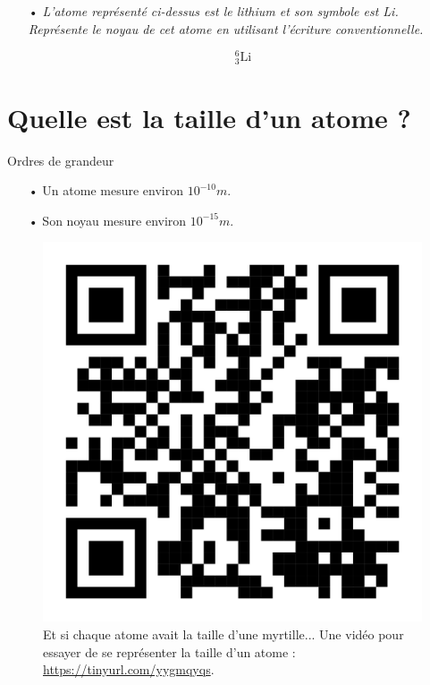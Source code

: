 \documentclass[12pt,a4paper]{article}
\begin{document}
\begin{itemize}
\item[•] \emph{L'atome représenté ci-dessus est le lithium et son symbole est Li.
Représente le noyau de cet atome en utilisant l'écriture conventionnelle.}

\[
^\text{6}_\text{3}\text{Li}
\]
\end{itemize}

\section{Quelle est la taille d'un atome ?}

\begin{definition}
Ordres de grandeur
\begin{itemize}
\item[•] Un atome mesure environ $\unit{10^{-10}}{m}$.
\item[•] Son noyau mesure environ $\unit{10^{-15}}{m}$.
\end{itemize}
\end{definition}

\begin{figure}[h]
\center
\includegraphics[scale=0.03]{images/qr_how_small_atoms_are.png}
\caption{Et si chaque atome avait la taille d'une myrtille... Une vidéo pour essayer de se représenter la taille d'un atome : \href{https://tinyurl.com/yygmqyqs}{https://tinyurl.com/yygmqyqs}.}
\end{figure}
\end{document}
